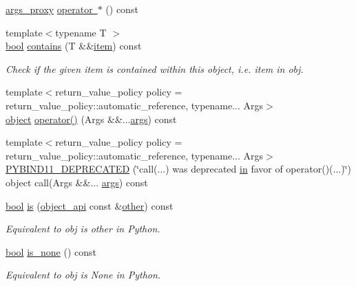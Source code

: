 \begin{DoxyCompactItemize}
\mbox{\hyperlink{classargs__proxy}{args\+\_\+proxy}} \mbox{\hyperlink{classobject__api_aa2e1efe3fe71542b4ebb71cd3df86283}{operator $\ast$}} () const
\item 
{\footnotesize template$<$typename T $>$ }\\\mbox{\hyperlink{asdl_8h_af6a258d8f3ee5206d682d799316314b1}{bool}} \mbox{\hyperlink{classobject__api_a07869da2a7cdbcb1a8877c50b18aee83}{contains}} (T \&\&\mbox{\hyperlink{dictobject_8h_a54447cc31a87ae88effdc512eb6d5496}{item}}) const
\begin{DoxyCompactList}\small\item\em Check if the given item is contained within this object, i.\+e. {\ttfamily item in obj}. \end{DoxyCompactList}\item 
{\footnotesize template$<$return\+\_\+value\+\_\+policy policy = return\+\_\+value\+\_\+policy\+::automatic\+\_\+reference, typename... Args$>$ }\\\mbox{\hyperlink{classobject}{object}} \mbox{\hyperlink{classobject__api_abe9df612ead8f4239dc32154d68e0cc1}{operator()}} (Args \&\&...\mbox{\hyperlink{classargs}{args}}) const
\item 
{\footnotesize template$<$return\+\_\+value\+\_\+policy policy = return\+\_\+value\+\_\+policy\+::automatic\+\_\+reference, typename... Args$>$ }\\\mbox{\hyperlink{classobject__api_a805215f1a7d50f7fb6a6ffb723707c73}{P\+Y\+B\+I\+N\+D11\+\_\+\+D\+E\+P\+R\+E\+C\+A\+T\+ED}} (\char`\"{}call(...) was deprecated \mbox{\hyperlink{_s_d_l__opengl__glext_8h_a83ad0ee7f1e06b59c90271716e689080}{in}} favor of operator()(...)\char`\"{}) object call(Args \&\&... \mbox{\hyperlink{classargs}{args}}) const
\item 
\mbox{\hyperlink{asdl_8h_af6a258d8f3ee5206d682d799316314b1}{bool}} \mbox{\hyperlink{classobject__api_a63b93f9f16e8e08c9672fe553c054885}{is}} (\mbox{\hyperlink{classobject__api}{object\+\_\+api}} const \&\mbox{\hyperlink{dictobject_8h_abd4733e17e86acb453bda62bc8b96adf}{other}}) const
\begin{DoxyCompactList}\small\item\em Equivalent to {\ttfamily obj is other} in Python. \end{DoxyCompactList}\item 
\mbox{\hyperlink{asdl_8h_af6a258d8f3ee5206d682d799316314b1}{bool}} \mbox{\hyperlink{classobject__api_a29bb566d25e37a236a322267ef1c59eb}{is\+\_\+none}} () const
\begin{DoxyCompactList}\small\item\em Equivalent to {\ttfamily obj is None} in Python. \end{DoxyCompactList}\item 

\end{DoxyCompactItemize}

